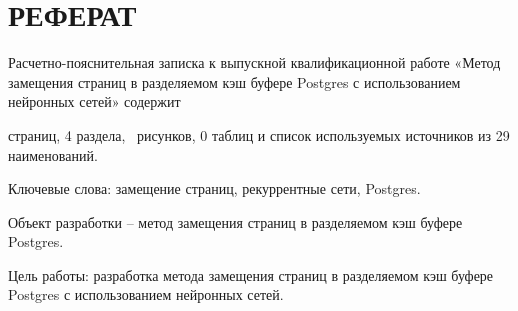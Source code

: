 \setcounter{page}{5}

\chapter*{РЕФЕРАТ}







Расчетно-пояснительная записка к выпускной квалификационной работе «Метод замещения страниц в разделяемом кэш буфере Postgres с использованием нейронных сетей» содержит \begin{NoHyper}\pageref{LastPage}\end{NoHyper}страниц, 4 раздела, \totfig~рисунков, 0 таблиц и список используемых источников из 29 наименований.

Ключевые слова: замещение страниц, рекуррентные сети, Postgres.
	
Объект разработки -- метод замещения страниц в разделяемом кэш буфере Postgres.

Цель работы: разработка метода замещения страниц в разделяемом кэш буфере Postgres с использованием нейронных сетей. 

